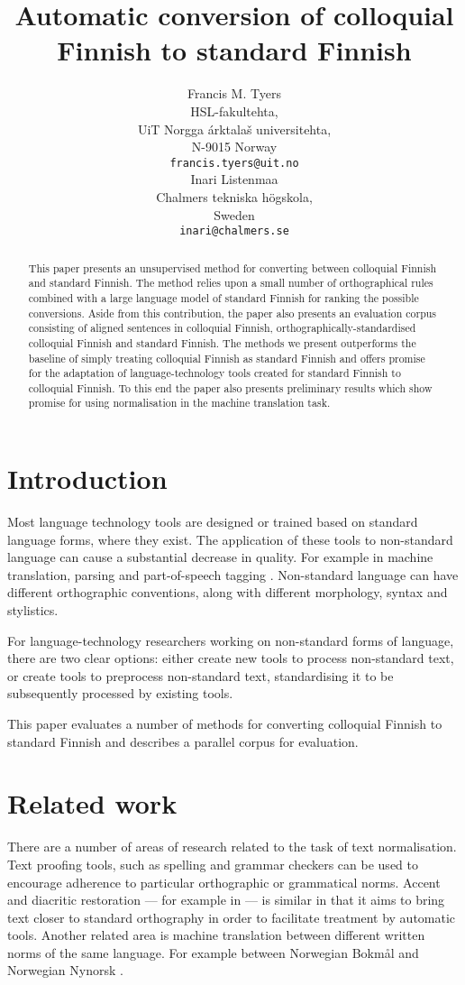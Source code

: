 \documentclass[11pt]{article}
\title{Automatic conversion of colloquial Finnish to standard Finnish}
\author{Francis M. Tyers\\
  HSL-fakultehta, \\
  UiT Norgga \'{a}rktala\v{s} universitehta, \\
  N-9015 Norway \\
  {\tt francis.tyers@uit.no} \\\And
  Inari Listenmaa\\
  Chalmers tekniska h\"{o}gskola, \\
  Sweden \\
  {\tt inari@chalmers.se} \\}
\date{}
\begin{document}
\maketitle
\begin{abstract}
  This paper presents an unsupervised method for converting between colloquial Finnish
  and standard Finnish. The method relies upon a small number of orthographical rules
  combined with a large language model of standard Finnish for ranking the possible 
  conversions. Aside from this contribution, the paper also presents an evaluation
  corpus consisting of aligned sentences in colloquial Finnish, orthographically-standardised
  colloquial Finnish and standard Finnish. The methods we present outperforms the baseline
  of simply treating colloquial Finnish as standard Finnish and offers promise for the adaptation
  of language-technology tools created for standard Finnish to colloquial Finnish. To this end
  the paper also presents preliminary results which show promise for using normalisation in 
  the machine translation task.
\end{abstract}

\section{Introduction}

Most language technology tools are designed or trained based on standard language 
forms, where they exist. The application of these tools to non-standard
language can cause a substantial decrease in quality. For example in machine translation,
parsing and part-of-speech tagging \cite{eisenstein2013}. Non-standard language can 
have different orthographic conventions, along with different morphology, syntax and stylistics.

For language-technology researchers working on non-standard forms of language, there are 
two clear options: either create new tools to process non-standard text,
  or create tools to preprocess non-standard text, standardising it to be subsequently processed
 by existing tools.

This paper evaluates a number of methods for converting colloquial Finnish to 
standard Finnish and describes a parallel corpus for evaluation.

\section{Related work}

There are a number of areas of research related to the task of text normalisation. Text
proofing tools, such as spelling and grammar checkers \cite{kukich1992} can be used to encourage adherence
to particular orthographic or grammatical norms. Accent and diacritic restoration --- for example in  --- is similar
in that it aims to bring text closer to standard orthography in order to facilitate treatment by 
automatic tools. Another related area is machine translation between different written norms of 
the same language. For example between Norwegian Bokm\aa{}l and Norwegian Nynorsk \cite{unhammer2009}.
\end{document}
